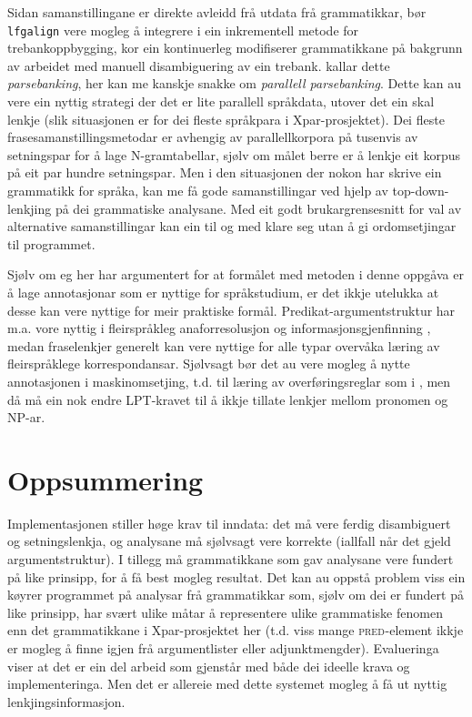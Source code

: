 \documentclass[12pt,a4paper,oneside,draft]{report}
\newcommand{\F}[2]{\textsc{#1}\ensuremath{_{#2}}}
\newcommand{\PRED}{\F{pred}{}}
\begin{document}
Sidan samanstillingane er direkte avleidd frå utdata frå grammatikkar,
 bør \texttt{lfgalign} vere mogleg å integrere i ein inkrementell metode for
 trebankoppbygging, kor ein kontinuerleg modifiserer grammatikkane på
 bakgrunn av arbeidet med manuell disambiguering av ein trebank.
 \citet{rosen2007tmt} kallar dette \emph{parsebanking}, her kan me kanskje
 snakke om \emph{parallell parsebanking}. Dette kan au vere ein nyttig
 strategi der det er lite parallell språkdata, utover det ein skal
 lenkje (slik situasjonen er for dei fleste språkpara i
 Xpar-prosjektet). Dei fleste frasesamanstillingsmetodar er avhengig
 av parallellkorpora på tusenvis av setningspar for å lage
 N-gramtabellar, sjølv om målet berre er å lenkje eit korpus på eit
 par hundre setningspar. Men i den situasjonen der nokon har skrive
 ein grammatikk for språka, kan me få gode samanstillingar ved hjelp
 av top-down-lenkjing på dei grammatiske analysane. Med eit godt
 brukargrensesnitt for val av alternative samanstillingar kan ein til
 og med klare seg utan å gi ordomsetjingar til programmet.

Sjølv om eg her har argumentert for at formålet med metoden i denne
 oppgåva er å lage annotasjonar som er nyttige for språkstudium, er
 det ikkje utelukka at desse kan vere nyttige for meir praktiske
 formål. Predikat-argumentstruktur har m.a. vore nyttig i
 fleirspråkleg anaforresolusjon og informasjonsgjenfinning
 \citep{surdeanu2003upa,azzam1998crm}, medan fraselenkjer generelt kan
 vere nyttige for alle typar overvåka læring av fleirspråklege
 korrespondansar. Sjølvsagt bør det au vere mogleg å nytte
 annotasjonen i maskinomsetjing, t.d. til læring av overføringsreglar
 som i \citet{riezler2006gmt,graham2009fts}, men då må ein nok endre
 LPT-kravet til å ikkje tillate lenkjer mellom pronomen og NP-ar.


\section{Oppsummering}
\label{sec-5.6}

Implementasjonen stiller høge krav til inndata: det må vere ferdig
 disambiguert og setningslenkja, og analysane må sjølvsagt vere
 korrekte (iallfall når det gjeld argumentstruktur). I tillegg må
 grammatikkane som gav analysane vere fundert på like prinsipp, for å
 få best mogleg resultat. Det kan au oppstå problem viss ein køyrer
 programmet på analysar frå grammatikkar som, sjølv om dei er fundert
 på like prinsipp, har svært ulike måtar å representere ulike
 grammatiske fenomen enn det grammatikkane i Xpar-prosjektet her
 (t.d. viss mange \PRED{}-element ikkje er mogleg å finne igjen frå
 argumentlister eller adjunktmengder). Evalueringa viser at det er ein
 del arbeid som gjenstår med både dei ideelle krava og
 implementeringa. Men det er allereie med dette systemet mogleg å få
 ut nyttig lenkjingsinformasjon.
\end{document}
